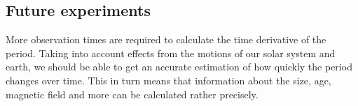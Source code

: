 \documentclass[twoside,twocolumn]{article}
\begin{document}
	\subsection{Future experiments}
	More observation times are required to calculate the time derivative of the period. Taking into account effects from the motions of our solar system and earth, we should be able to get an accurate estimation of how quickly the period changes over time. This in turn means that information about the size, age, magnetic field and more can be calculated rather precisely. 
	
%
%
\end{document}
